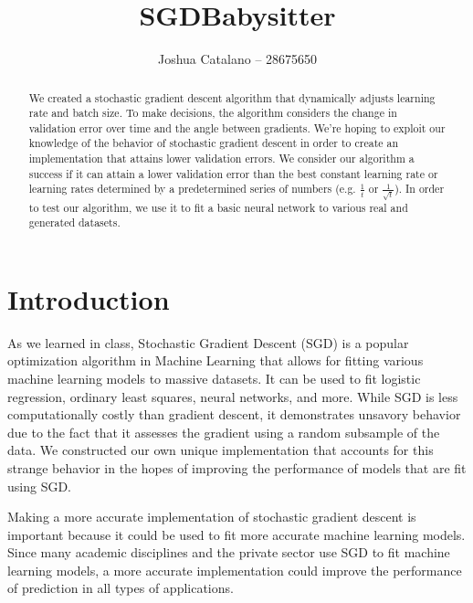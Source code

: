 \documentclass{article}
\title{SGDBabysitter}
\author{Joshua Catalano -- 28675650
}
\begin{document}

\maketitle

\begin{abstract}
  We created a stochastic gradient descent algorithm that dynamically adjusts learning rate and batch size. To make decisions, the algorithm considers the change in validation error over time and the angle between gradients.  We're hoping to exploit our knowledge of the behavior of stochastic gradient descent in order to create an implementation that attains lower validation errors. We consider our algorithm a success if it can attain a lower validation error than the best constant learning rate or learning rates determined by a predetermined series of numbers (e.g. $\frac{1}{t}$ or $\frac{1}{\sqrt{t}}$).  In order to test our algorithm, we use it to fit a basic neural network to various real and generated datasets.   
\end{abstract}

\section*{Introduction}
As we learned in class, Stochastic Gradient Descent (SGD) is a popular optimization algorithm in Machine Learning that allows for fitting various machine learning models to massive datasets. It can be used to fit logistic regression, ordinary least squares, neural networks, and more. While SGD is less computationally costly than gradient descent, it demonstrates unsavory behavior due to the fact that it assesses the gradient using a random subsample of the data. We constructed our own unique implementation that accounts for this strange behavior in the hopes of improving the performance of models that are fit using SGD.
\par Making a more accurate implementation of stochastic gradient descent is important because it could be used to fit more accurate machine learning models. Since many academic disciplines and the private sector use SGD to fit machine learning models, a more accurate implementation could improve the performance of prediction in all types of applications. 
\end{document}
